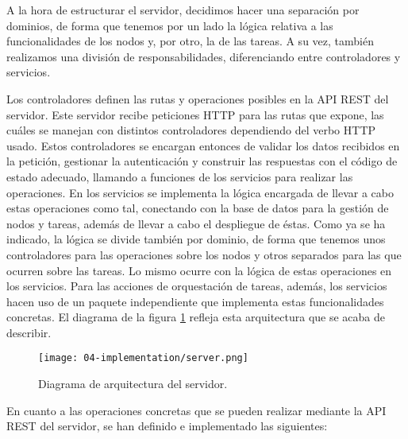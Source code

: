 A la hora de estructurar el servidor, decidimos hacer una separación por
dominios, de forma que tenemos por un lado la lógica relativa a las
funcionalidades de los nodos y, por otro, la de las tareas. A su vez, también
realizamos una división de responsabilidades, diferenciando entre controladores
y servicios.

Los controladores definen las rutas y operaciones posibles en la API REST del
servidor. Este servidor recibe peticiones HTTP para las rutas que expone, las
cuáles se manejan con distintos controladores dependiendo del verbo HTTP usado.
Estos controladores se encargan entonces de validar los datos recibidos en la
petición, gestionar la autenticación y construir las respuestas con el código de
estado adecuado, llamando a funciones de los servicios para realizar las
operaciones. En los servicios se implementa la lógica encargada de llevar a cabo
estas operaciones como tal, conectando con la base de datos para la gestión de
nodos y tareas, además de llevar a cabo el despliegue de éstas. Como ya se ha
indicado, la lógica se divide también por dominio, de forma que tenemos unos
controladores para las operaciones sobre los nodos y otros separados para las
que ocurren sobre las tareas. Lo mismo ocurre con la lógica de estas operaciones
en los servicios. Para las acciones de orquestación de tareas, además, los
servicios hacen uso de un paquete independiente que implementa estas
funcionalidades concretas. El diagrama de la figura
\ref{fig:04-server_architecture} refleja esta arquitectura que se acaba de
describir.

\begin{figure}
    \centering
    \texttt{[image: 04-implementation/server.png]}
    \caption{Diagrama de arquitectura del servidor.}
    \label{fig:04-server_architecture}
\end{figure}

En cuanto a las operaciones concretas que se pueden realizar mediante la API
REST del servidor, se han definido e implementado las siguientes:

